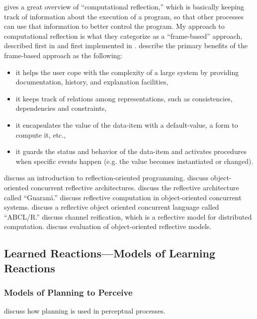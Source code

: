 \cite{maes:1987} gives a great overview of ``computational reflection,'' which is basically keeping track of information about the execution of a program, so that other processes can use that information to better control the program.
My approach to computational reflection is what they categorize as a ``frame-based'' approach, described first in \cite{minsky:1975} and first implemented in \cite{roberts:1977}.
\cite{maes:1987} describe the primary benefits of the frame-based approach as the following:

\begin{itemize}
\item{it helps the user cope with the complexity of a large system by providing documentation, history, and explanation facilities,}
\item{it keeps track of relations among representations, such as consistencies, dependencies and constraints,}
\item{it encapsulates the value of the data-item with a default-value, a form to compute it, etc.,}
\item{it guards the status and behavior of the data-item and activates procedures when specific events happen (e.g. the value becomes instantiated or changed).}
\end{itemize}

\cite{sobel:1996} discuss an introduction to reflection-oriented programming.
\cite{matsuoka:1992} discuss object-oriented concurrent reflective architectures.
\cite{oliva:1998} discuss the reflective architecture called ``Guaraná.''
\cite{watanabe:1989} discuss reflective computation in object-oriented concurrent systems.
\cite{yonezawa:1990} discuss a reflective object oriented concurrent language called ``ABCL/R.''
\cite{ancona:1998} discuss channel reification, which is a reflective model for distributed computation.
\cite{cazzola:1998} discuss evaluation of object-oriented reflective models.

\subsection{Learned Reactions---Models of Learning Reactions}

\subsubsection{Models of Planning to Perceive}

\cite{pryorcollins:1995} discuss how planning is used in perceptual processes.


